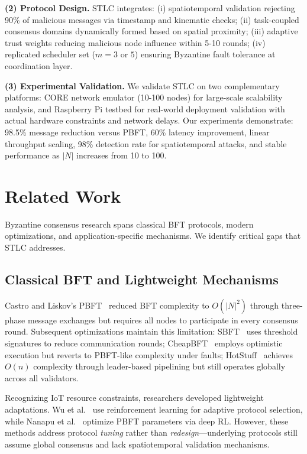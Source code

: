 \documentclass[lettersize,journal]{IEEEtran}
\begin{document}
\textbf{(2) Protocol Design.} STLC integrates: (i) spatiotemporal validation rejecting 90\% of malicious messages via timestamp and kinematic checks; (ii) task-coupled consensus domains dynamically formed based on spatial proximity; (iii) adaptive trust weights reducing malicious node influence within 5-10 rounds; (iv) replicated scheduler set ($m=3$ or $5$) ensuring Byzantine fault tolerance at coordination layer.

\textbf{(3) Experimental Validation.} We validate STLC on two complementary platforms: CORE network emulator (10-100 nodes) for large-scale scalability analysis, and Raspberry Pi testbed for real-world deployment validation with actual hardware constraints and network delays. Our experiments demonstrate: 98.5\% message reduction versus PBFT, 60\% latency 
improvement, linear throughput scaling, 98\% detection rate for spatiotemporal attacks, and stable performance as $|N|$ increases from 10 to 100.

\section{Related Work}
\label{sec:related}

Byzantine consensus research spans classical BFT protocols, modern optimizations, and application-specific mechanisms. We identify critical gaps that STLC addresses.

\subsection{Classical BFT and Lightweight Mechanisms}

Castro and Liskov's PBFT~\cite{habibi2023performance, ye2024tp} reduced BFT complexity to $O(|N|^2)$ through three-phase message exchanges but requires all nodes to participate in every consensus round. Subsequent optimizations maintain this limitation: SBFT~\cite{arun2022scalable} uses threshold signatures to reduce communication rounds; CheapBFT~\cite{wang2022bft} employs optimistic execution but reverts to PBFT-like complexity under faults; HotStuff~\cite{wang2024improved} achieves $O(n)$ complexity through leader-based pipelining but still operates globally across all validators.

Recognizing IoT resource constraints, researchers developed lightweight adaptations. Wu et al.~\cite{wu2023learning} use reinforcement learning for adaptive protocol selection, while Nanapu et al.~\cite{nanapu2025d2bft} optimize PBFT parameters via deep RL. However, these methods address protocol \textit{tuning} rather than \textit{redesign}—underlying protocols still assume global consensus and lack spatiotemporal validation mechanisms.
\end{document}
